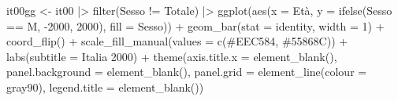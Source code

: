 \documentclass[
]{article}
\newenvironment{Shaded}{\begin{snugshade}}{\end{snugshade}}
\newcommand{\AttributeTok}[1]{\textcolor[rgb]{0.40,0.45,0.13}{#1}}
\newcommand{\DecValTok}[1]{\textcolor[rgb]{0.68,0.00,0.00}{#1}}
\newcommand{\FunctionTok}[1]{\textcolor[rgb]{0.28,0.35,0.67}{#1}}
\newcommand{\NormalTok}[1]{\textcolor[rgb]{0.00,0.23,0.31}{#1}}
\newcommand{\OtherTok}[1]{\textcolor[rgb]{0.00,0.23,0.31}{#1}}
\newcommand{\SpecialCharTok}[1]{\textcolor[rgb]{0.37,0.37,0.37}{#1}}
\newcommand{\StringTok}[1]{\textcolor[rgb]{0.13,0.47,0.30}{#1}}
\begin{document}
\begin{Shaded}
\begin{Highlighting}[]
\NormalTok{it00gg }\OtherTok{\textless{}{-}}\NormalTok{ it00 }\SpecialCharTok{|\textgreater{}} 
  \FunctionTok{filter}\NormalTok{(Sesso }\SpecialCharTok{!=} \StringTok{\textquotesingle{}Totale\textquotesingle{}}\NormalTok{) }\SpecialCharTok{|\textgreater{}} 
  \FunctionTok{ggplot}\NormalTok{(}\FunctionTok{aes}\NormalTok{(}\AttributeTok{x =}\NormalTok{ Età,}
             \AttributeTok{y =} \FunctionTok{ifelse}\NormalTok{(Sesso }\SpecialCharTok{==} \StringTok{\textquotesingle{}M\textquotesingle{}}\NormalTok{,}
                        \SpecialCharTok{{-}}\StringTok{\textasciigrave{}}\AttributeTok{2000}\StringTok{\textasciigrave{}}\NormalTok{, }\StringTok{\textasciigrave{}}\AttributeTok{2000}\StringTok{\textasciigrave{}}\NormalTok{),}
             \AttributeTok{fill =}\NormalTok{ Sesso)) }\SpecialCharTok{+}
  \FunctionTok{geom\_bar}\NormalTok{(}\AttributeTok{stat =} \StringTok{\textquotesingle{}identity\textquotesingle{}}\NormalTok{, }\AttributeTok{width =} \DecValTok{1}\NormalTok{) }\SpecialCharTok{+}
  \FunctionTok{coord\_flip}\NormalTok{() }\SpecialCharTok{+}
  \FunctionTok{scale\_fill\_manual}\NormalTok{(}\AttributeTok{values =} \FunctionTok{c}\NormalTok{(}\StringTok{\textquotesingle{}\#EEC584\textquotesingle{}}\NormalTok{, }\StringTok{\textquotesingle{}\#55868C\textquotesingle{}}\NormalTok{)) }\SpecialCharTok{+}
  \FunctionTok{labs}\NormalTok{(}\AttributeTok{subtitle =} \StringTok{\textquotesingle{}Italia 2000\textquotesingle{}}\NormalTok{) }\SpecialCharTok{+}
  \FunctionTok{theme}\NormalTok{(}\AttributeTok{axis.title.x =} \FunctionTok{element\_blank}\NormalTok{(),}
        \AttributeTok{panel.background =} \FunctionTok{element\_blank}\NormalTok{(),}
        \AttributeTok{panel.grid =} \FunctionTok{element\_line}\NormalTok{(}\AttributeTok{colour =} \StringTok{\textquotesingle{}gray90\textquotesingle{}}\NormalTok{),}
        \AttributeTok{legend.title =} \FunctionTok{element\_blank}\NormalTok{())}


\end{Highlighting}
\end{Shaded}
\end{document}
